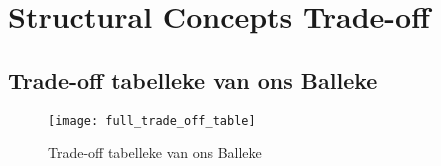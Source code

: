 \documentclass[a3paper,11pt,fleqn,oneside,landscape]{a3figure}
\begin{document}
\appendix
\setcounter{chapter}{1}
\chapter{Structural Concepts Trade-off}
\setcounter{table}{1}
\setcounter{section}{1}
%
\setcounter{page}{180}

\section{Trade-off tabelleke van ons Balleke}
%
\begin{figure}[!ht]
    \centering
    \texttt{[image: full\_trade\_off\_table]}
    \caption{Trade-off tabelleke van ons Balleke}
\end{figure}
\end{document}
